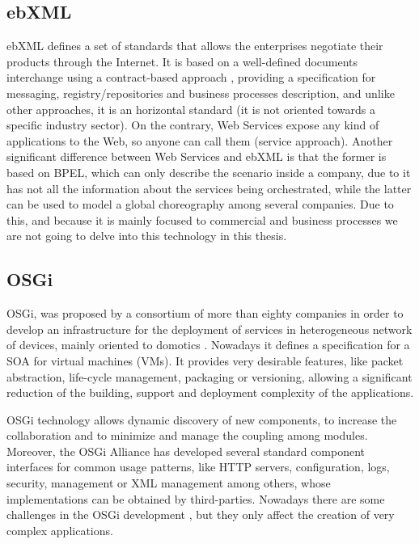 \subsection{ebXML}
ebXML defines a set of standards that allows the enterprises negotiate their products through the Internet. It is based on a well-defined documents interchange using a contract-based approach \cite{Patil03ebxmlVsWS}, providing a specification for messaging, registry/repositories and business processes description, and unlike other approaches, it is an horizontal standard (it is not oriented towards a specific industry sector). On the contrary, Web Services expose any kind of applications to the Web, so anyone can call them (service approach). Another significant difference between Web Services and ebXML is that the former is based on BPEL, which can only describe the scenario inside a company, due to it has not all the information about the services being orchestrated, while the latter can be used to model a global choreography among several companies. Due to this, and because it is mainly focused to commercial and business processes we are not going to delve into this technology in this thesis.

\subsection{OSGi}

OSGi, was proposed by a consortium of more than
eighty companies in order to develop an infrastructure for the
deployment of services in heterogeneous network of devices, mainly
oriented to domotics \cite{GarciaSanchez2013Gateway}. Nowadays it defines a
specification for a SOA for virtual
machines (VMs). It provides very desirable features, like
packet abstraction, life-cycle management, packaging or versioning,
allowing a significant reduction of the building, support and deployment
complexity of the applications. 

OSGi technology allows dynamic discovery of new components, to increase the collaboration and to minimize and manage the coupling
among modules. Moreover, the
OSGi Alliance has developed several standard component interfaces for
common usage patterns, like HTTP servers, configuration, logs, security,
management or XML management among others, whose implementations can
be obtained by third-parties. Nowadays there are some challenges 
in the OSGi development \cite{Kriens2008OsgiChallenges}, but they only affect the creation of very complex applications.

